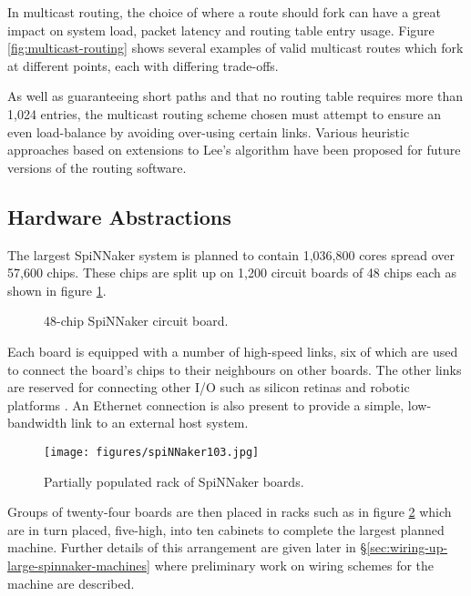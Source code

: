				In multicast routing, the choice of where a route should fork can have a
				great impact on system load, packet latency and routing table entry
				usage. Figure \ref{fig:multicast-routing} shows several examples of
				valid multicast routes which fork at different points, each with
				differing trade-offs.
				
				As well as guaranteeing short paths and that no routing table requires
				more than 1,024 entries, the multicast routing scheme chosen must
				attempt to ensure an even load-balance by avoiding over-using certain
				links. Various heuristic approaches based on extensions to Lee's
				algorithm have been proposed for future versions of the routing
				software\cite{davidson13}.
		
		\subsection{Hardware Abstractions}
			
			The largest SpiNNaker system is planned to contain 1,036,800 cores spread
			over 57,600 chips.  These chips are split up on 1,200 circuit boards of
			48 chips each as shown in figure \ref{fig:spinn4labelled}.
			
			\begin{figure}[p!]
				\center
				
				\caption{48-chip SpiNNaker circuit board.}
				\label{fig:spinn4labelled}
			\end{figure}
			
			Each board is equipped with a number of high-speed links, six of which are
			used to connect the board's chips to their neighbours on other boards. The
			other links are reserved for connecting other I/O such as silicon retinas
			and robotic platforms \cite{davies10}. An Ethernet connection is also
			present to provide a simple, low-bandwidth link to an external host
			system.
			
			\begin{figure}[p!]
				\center
				\texttt{[image: figures/spiNNaker103.jpg]}
				\caption{Partially populated rack of SpiNNaker boards.}
				\label{fig:spiNNaker103}
			\end{figure}
			
			Groups of twenty-four boards are then placed in racks such as in figure
			\ref{fig:spiNNaker103} which are in turn placed, five-high, into ten
			cabinets to complete the largest planned machine. Further details of this
			arrangement are given later in
			\S\ref{sec:wiring-up-large-spinnaker-machines} where preliminary work on
			wiring schemes for the machine are described.
		
